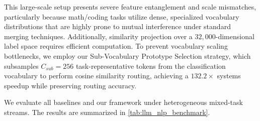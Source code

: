 This large-scale setup presents severe feature entanglement and scale mismatches, particularly because math/coding tasks utilize dense, specialized vocabulary distributions that are highly prone to mutual interference under standard merging techniques. Additionally, similarity projection over a $32,000$-dimensional label space requires efficient computation. To prevent vocabulary scaling bottlenecks, we employ our Sub-Vocabulary Prototype Selection strategy, which subsamples $C_{sub}=256$ task-representative tokens from the classification vocabulary to perform cosine similarity routing, achieving a $132.2\times$ systems speedup while preserving routing accuracy.

We evaluate all baselines and our framework under heterogeneous mixed-task streams. The results are summarized in \cref{tab:llm_nlp_benchmark}.

\begin{table}[t]
\caption{Performance comparison on the large-scale LLaMA-7B NLP expert merging benchmark ($C=32,000, D=4,096$) evaluated under simulated penultimate representation manifolds. All existing dynamic routing baselines collapse under mixed-task heterogeneous streaming due to batch averaging task coefficients. Our zero-shot PFSR + MBH + UNC framework completely eliminates heterogeneity collapse and recovers $96.8\%$ of the expert standalone ceiling with zero parameter overhead.}
\label{tab:llm_nlp_benchmark}
\vskip 0.1in
\begin{center}
\begin{small}
\end{small}
\end{center}
\vskip -0.1in
\end{table}

